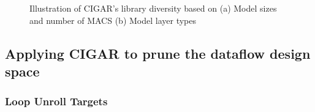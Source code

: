 \begin{figure}
    \centering
    \caption{Illustration of CIGAR's library diversity based on (a) Model sizes and number of MACS (b) Model layer types}
    \label{fig:cigar_library_overview}
\end{figure}

\clearpage

\subsection{Applying CIGAR to prune the dataflow design space}
\label{chap:dda:dataflow_dse:pruning:applying_it}

\subsubsection{Loop Unroll Targets}
\label{chap:dda:dataflow_dse:pruning:applying_it:loop_unroll_targets}

